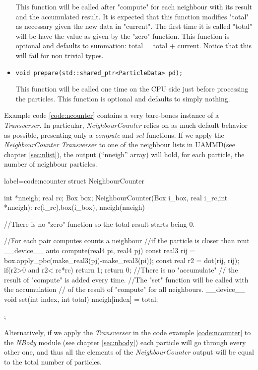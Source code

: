 \documentclass[twoside,openright,titlepage,numbers=noenddot,%
headinclude,footinclude,cleardoublepage=empty,abstract=on,
BCOR=5mm,fontsize=11pt, dvipsnames, paper=b5
]{scrreprt}
\def\ucpp{uammd_cpp_lexer.py:UAMMDCppLexer -x}
\newcommand{\uammd}{\gls{UAMMD}\xspace}
\begin{document}
\begin{itemize}
   
  This function will be called after "compute" for each neighbour with its result and the accumulated result.
  It is expected that this function modifies "total" as necessary given the new data in "current".
  The first time it is called "total" will be have the value as given by the "zero" function.
  This function is optional and defaults to summation: total = total + current. Notice that this will fail for non trivial types.
     
\item \texttt{void prepare(std::shared_ptr<ParticleData> pd);}

  
  This function will be called one time on the CPU side just before processing the particles.
  This function is optional and defaults to simply nothing.
 \end{itemize}

Example code \ref{code:ncounter} contains a very bare-bones instance of a \emph{Transverser}. In particular, \emph{NeighbourCounter} relies on as much default behavior as possible, presenting only a \emph{compute} and \emph{set} functions.
If we apply the \emph{NeighbourCounter} \emph{Transverser} to one of the neighbour lists in \uammd (see chapter \ref{sec:nlist}), the output (``nneigh'' array) will hold, for each particle, the number of neighbour particles.
\begin{code2}{label=code:ncounter}
struct NeighbourCounter{
  int *nneigh;
  real rc;
  Box box;
  NeighbourCounter(Box i_box, real i_rc,int *nneigh):
    rc(i_rc),box(i_box),
    nneigh(nneigh){}

  //There is no "zero" function so the total result starts being 0.
  
  //For each pair computes counts a neighbour 
  //if the particle is closer than rcut
  __device__ auto compute(real4 pi, real4 pj){
    const real3 rij = box.apply_pbc(make_real3(pj)-make_real3(pi));
    const real r2 = dot(rij, rij);
    if(r2>0 and r2< rc*rc){
      return 1;
    }
    return 0;
  }
  //There is no "accumulate"
  // the result of "compute" is added every time.
  //The "set" function will be called with the accumulation
  // of the result of "compute" for all neighbours. 
  __device__ void set(int index, int total){
    nneigh[index] = total;
  }
};
\end{code2}
Alternatively, if we apply the \emph{Transverser} in the code example \ref{code:ncounter} to the \emph{NBody} module (see chapter \ref{sec:nbody}) each particle will go through every other one, and thus all the elements of the \emph{NeighbourCounter} output will be equal to the total number of particles.
\end{document}
